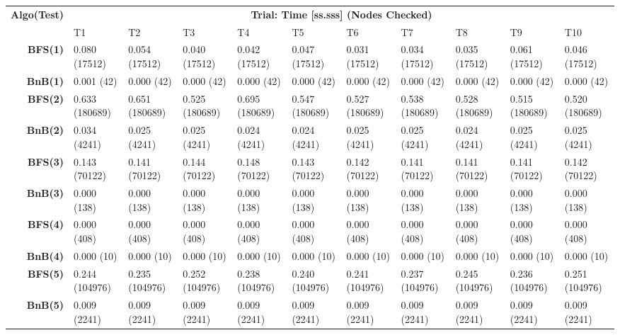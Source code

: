 \begin{table}[ht]
  \centering
  \begin{adjustbox}{width=1.5\textwidth,center}

\begin{tabular}{r|llllllllll}
\toprule
\textbf{Algo(Test)} & \multicolumn{10}{c}{\textbf{Trial: Time [ss.sss] (Nodes Checked)}} \\
 & T1 & T2 & T3 & T4 & T5 & T6 & T7 & T8 & T9 & T10 \\ \midrule

\textbf{BFS(1)} & 0.080 (17512) & 0.054 (17512) & 0.040 (17512) & 0.042 (17512) & 0.047 (17512) & 0.031 (17512) & 0.034 (17512) & 0.035 (17512) & 0.061 (17512) & 0.046 (17512) \\
\textbf{BnB(1)} & 0.001 (42) & 0.000 (42) & 0.000 (42) & 0.000 (42) & 0.000 (42) & 0.000 (42) & 0.000 (42) & 0.000 (42) & 0.000 (42) & 0.000 (42) \\ \hline

\textbf{BFS(2)} & 0.633 (180689) & 0.651 (180689) & 0.525 (180689) & 0.695 (180689) & 0.547 (180689) & 0.527 (180689) & 0.538 (180689) & 0.528 (180689) & 0.515 (180689) & 0.520 (180689) \\
\textbf{BnB(2)} & 0.034 (4241) & 0.025 (4241) & 0.025 (4241) & 0.024 (4241) & 0.024 (4241) & 0.025 (4241) & 0.025 (4241) & 0.024 (4241) & 0.025 (4241) & 0.025 (4241) \\ \hline

\textbf{BFS(3)} & 0.143 (70122) & 0.141 (70122) & 0.144 (70122) & 0.148 (70122) & 0.143 (70122) & 0.142 (70122) & 0.141 (70122) & 0.141 (70122) & 0.141 (70122) & 0.142 (70122) \\
\textbf{BnB(3)} & 0.000 (138) & 0.000 (138) & 0.000 (138) & 0.000 (138) & 0.000 (138) & 0.000 (138) & 0.000 (138) & 0.000 (138) & 0.000 (138) & 0.000 (138) \\ \hline

\textbf{BFS(4)} & 0.000 (408) & 0.000 (408) & 0.000 (408) & 0.000 (408) & 0.000 (408) & 0.000 (408) & 0.000 (408) & 0.000 (408) & 0.000 (408) & 0.000 (408) \\
\textbf{BnB(4)} & 0.000 (10) & 0.000 (10) & 0.000 (10) & 0.000 (10) & 0.000 (10) & 0.000 (10) & 0.000 (10) & 0.000 (10) & 0.000 (10) & 0.000 (10) \\ \hline

\textbf{BFS(5)} & 0.244 (104976) & 0.235 (104976) & 0.252 (104976) & 0.238 (104976) & 0.240 (104976) & 0.241 (104976) & 0.237 (104976) & 0.245 (104976) & 0.236 (104976) & 0.251 (104976) \\
\textbf{BnB(5)} & 0.009 (2241) & 0.009 (2241) & 0.009 (2241) & 0.009 (2241) & 0.009 (2241) & 0.009 (2241) & 0.009 (2241) & 0.009 (2241) & 0.009 (2241) & 0.009 (2241) \\ \hline


\end{tabular}
\end{adjustbox}
\end{table}

